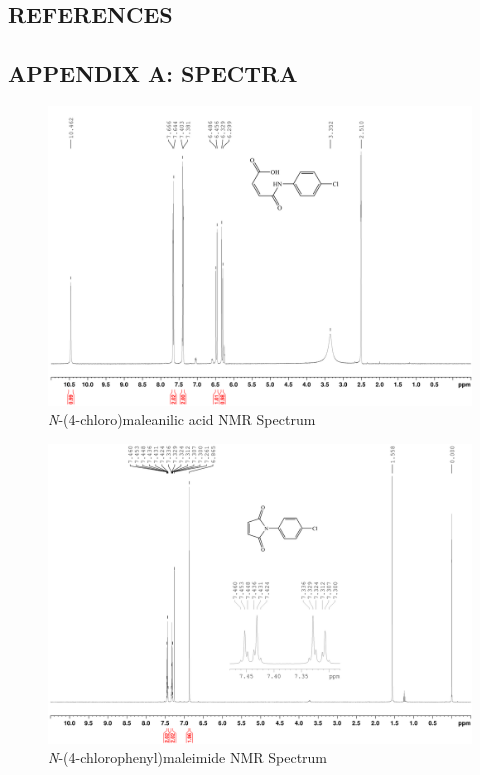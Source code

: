 \documentclass[11pt]{article}
\begin{document}
\newpage
\subsection*{REFERENCES}
\vspace{2mm}


\newpage
\subsection*{APPENDIX A: SPECTRA}

\begin{figure}[H]
    \centering
    \includegraphics[scale=0.105]{spectra/nmr9.1.png}
    \caption{\textit{N}-(4-chloro)maleanilic acid NMR Spectrum}
\end{figure}
\begin{figure}[H]
    \centering
    \includegraphics[scale=0.105]{spectra/nmr9.2.png}
    \caption{\textit{N}-(4-chlorophenyl)maleimide NMR Spectrum}
\end{figure}
\end{document}
